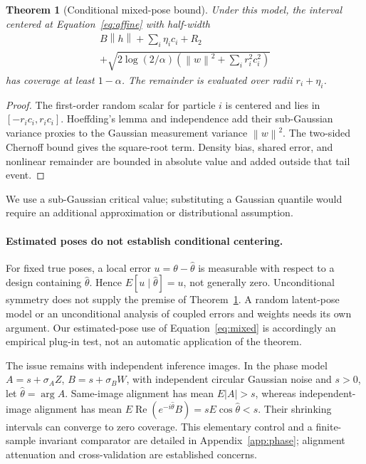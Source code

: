 \documentclass{article}
\newtheorem{theorem}{Theorem}
\newcommand{\norm}[1]{\left\|#1\right\|}
\begin{document}
\begin{theorem}[Conditional mixed-pose bound]\label{thm:mixed}
Under this model, the interval centered at Equation~\eqref{eq:affine} with half-width
\begin{align}\label{eq:mixed}
B\norm h+\sum_i\eta_i c_i+R_2\quad\quad\quad\quad\nonumber\\
+\sqrt{2\log(2/\alpha)\left(\norm w^2+\sum_i r_i^2c_i^2\right)}
\end{align}
has coverage at least $1-\alpha$. The remainder is evaluated over radii $r_i+\eta_i$.
\end{theorem}
\begin{proof}
The first-order random scalar for particle $i$ is centered and lies in $[-r_ic_i,r_ic_i]$. Hoeffding's lemma and independence add their sub-Gaussian variance proxies to the Gaussian measurement variance $\norm w^2$. The two-sided Chernoff bound gives the square-root term. Density bias, shared error, and nonlinear remainder are bounded in absolute value and added outside that tail event.
\end{proof}
We use a sub-Gaussian critical value; substituting a Gaussian quantile would require an additional approximation or distributional assumption.

\paragraph{Estimated poses do not establish conditional centering.}
For fixed true poses, a local error $u=\theta-\widehat\theta$ is measurable with respect to a design containing $\widehat\theta$. Hence $E[u\mid\widehat\theta]=u$, not generally zero. Unconditional symmetry does not supply the premise of Theorem~\ref{thm:mixed}. A random latent-pose model or an unconditional analysis of coupled errors and weights needs its own argument. Our estimated-pose use of Equation~\eqref{eq:mixed} is accordingly an empirical plug-in test, not an automatic application of the theorem.

The issue remains with independent inference images. In the phase model $A=s+\sigma_A Z$, $B=s+\sigma_B W$, with independent circular Gaussian noise and $s>0$, let $\widehat\theta=\arg A$. Same-image alignment has mean $E|A|>s$, whereas independent-image alignment has mean $E\operatorname{Re}(e^{-i\widehat\theta}B)=sE\cos\widehat\theta<s$. Their shrinking intervals can converge to zero coverage. This elementary control and a finite-sample invariant comparator are detailed in Appendix~\ref{app:phase}; alignment attenuation and cross-validation are established concerns.
\end{document}

